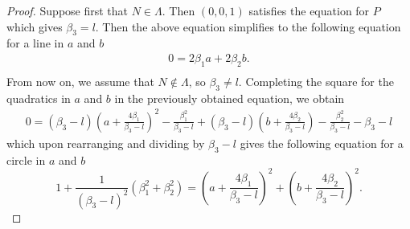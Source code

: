 \documentclass[12pt]{article}
\begin{document}
\begin{homeworkProblem}
\begin{proof}
  Suppose first that $ N\in \Lambda $. Then $ (0,0,1) $ satisfies the equation for $ P $ which gives $ \beta_{3}=l $.
  Then the above equation simplifies to the following equation for a line in $ a $ and $ b $
  \begin{align*}
    0= 2\beta_{1}a+2\beta_{2}b.\\
  \end{align*}
  From now on, we assume that $ N\not \in \Lambda $, so $ \beta_{3}\neq l $.
  Completing the square  for the quadratics in $ a $ and $ b $ in the previously obtained equation, we obtain
  \begin{align*}
    0 = (\beta_{3}-l)\left(a+\frac{4\beta_{1}}{\beta_{3}-l}\right)^{2}-\frac{\beta_{1}^{2}}{\beta_{3}-l} + (\beta_{3}-l)\left(b+\frac{4\beta_{2}}{\beta_{3}-l}\right)-\frac{\beta_{2}^{2}}{\beta_{3}-l} - \beta_{3}-l
  \end{align*}
  which upon rearranging and dividing by $ \beta_{3}-l $ gives the following equation for a circle in $ a  $ and $ b $
\[
    1 +\frac{1}{(\beta_{3}-l)^{2}}\left(\beta_{1}^{2}+\beta_{2}^{2}\right)  = \left(a+\frac{4\beta_{1}}{\beta_{3}-l}\right)^{2} + \left(b+\frac{4\beta_{2}}{\beta_{3}-l}\right)^{2}.
  \]
\end{proof}


\end{homeworkProblem}
\end{document}
